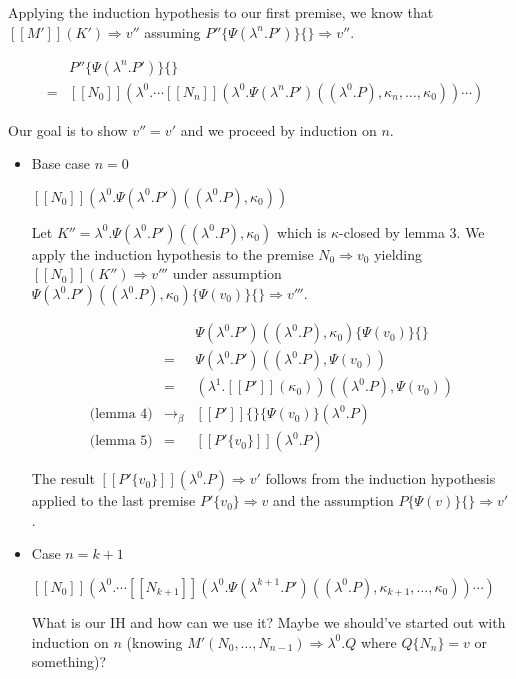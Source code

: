\documentclass[a4paper,11pt]{article}
\begin{document}
\begin{itemize}
Applying the induction hypothesis to our first premise, we know that $[\![M']\!](K') \Rightarrow v''$ assuming $P''\{\Psi(\lambda^{n}.P')\}\{\} \Rightarrow v''$.

\begin{eqnarray*}
&   & P''\{\Psi(\lambda^{n}.P')\}\{\} \\
& = & [\![N_{0}]\!](\lambda^{0}. \cdots [\![N_{n}]\!](\lambda^{0}.\Psi(\lambda^{n}.P')((\lambda^{0}.P), \kappa_{n}, \ldots, \kappa_{0})) \cdots )
\end{eqnarray*}

Our goal is to show $v'' = v'$ and we proceed by induction on $n$.

\begin{itemize}
\item{Base case $n = 0$}

$[\![N_{0}]\!](\lambda^{0}.\Psi(\lambda^{0}.P')((\lambda^{0}.P), \kappa_{0}))$

Let $K'' = \lambda^{0}.\Psi(\lambda^{0}.P')((\lambda^{0}.P), \kappa_{0})$ which is $\kappa$-closed by lemma 3. We apply the induction hypothesis to the premise $N_{0} \Rightarrow v_{0}$ yielding $[\![N_{0}]\!](K'') \Rightarrow v'''$ under assumption $\Psi(\lambda^{0}.P')((\lambda^{0}.P), \kappa_{0})\{\Psi(v_{0})\}\{\} \Rightarrow v'''$.

\begin{eqnarray*}
 &   & \Psi(\lambda^{0}.P')((\lambda^{0}.P), \kappa_{0})\{\Psi(v_{0})\}\{\} \\
 & = & \Psi(\lambda^{0}.P')((\lambda^{0}.P), \Psi(v_{0})) \\
 & = & (\lambda^{1}.[\![P']\!](\kappa_{0}))((\lambda^{0}.P), \Psi(v_{0})) \\
\mbox{(lemma 4)} & \rightarrow_{\beta} & [\![P']\!]\{\}\{\Psi(v_{0})\} (\lambda^{0}.P) \\
\mbox{(lemma 5)} & = & [\![P'\{v_{0}\}]\!] (\lambda^{0}.P)
\end{eqnarray*}

The result $[\![P'\{v_{0}\}]\!] (\lambda^{0}.P) \Rightarrow v'$
follows from the induction hypothesis applied to the last premise
$P'\{v_{0}\} \Rightarrow v$ and the assumption $P\{\Psi(v)\}\{\}
\Rightarrow v'$.


\item{Case $n = k + 1$}

$[\![N_{0}]\!](\lambda^{0}. \cdots [\![N_{k+1}]\!](\lambda^{0}.\Psi(\lambda^{k+1}.P')((\lambda^{0}.P), \kappa_{k+1}, \ldots, \kappa_{0})) \cdots )$

What is our IH and how can we use it? Maybe we should've started out with induction on $n$ (knowing $M'(N_{0}, \ldots, N_{n-1}) \Rightarrow \lambda^{0}.Q$ where $Q\{N_{n}\} = v$ or something)?



\end{itemize}
\end{itemize}
\end{document}
